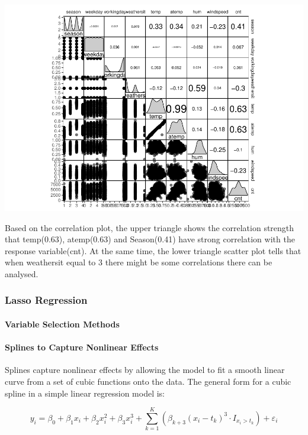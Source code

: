 \documentclass[
]{article}
\begin{document}
\includegraphics{ST-563-Final-Project_files/figure-latex/unnamed-chunk-1-2.pdf}

Based on the correlation plot, the upper triangle shows the correlation
strength that temp(0.63), atemp(0.63) and Season(0.41) have strong
correlation with the response variable(cnt). At the same time, the lower
triangle scatter plot tells that when weathersit equal to 3 there might
be some correlations there can be analysed.

\hypertarget{lasso-regression}{%
\subsubsection{Lasso Regression}\label{lasso-regression}}

\hypertarget{variable-selection-methods}{%
\paragraph{Variable Selection
Methods}\label{variable-selection-methods}}

\hypertarget{splines-to-capture-nonlinear-effects}{%
\paragraph{Splines to Capture Nonlinear
Effects}\label{splines-to-capture-nonlinear-effects}}

Splines capture nonlinear effects by allowing the model to fit a smooth
linear curve from a set of cubic functions onto the data. The general
form for a cubic spline in a simple linear regression model is:

\[y_i = \beta_0 + \beta_1 x_i + \beta_2 x_i^2 + \beta_3 x_i^3 + \sum_{k = 1}^K \left( \beta_{k + 3} (x_i - t_k)^3 \cdot I_{x_i > t_k} \right) + \varepsilon_i\]
\end{document}
